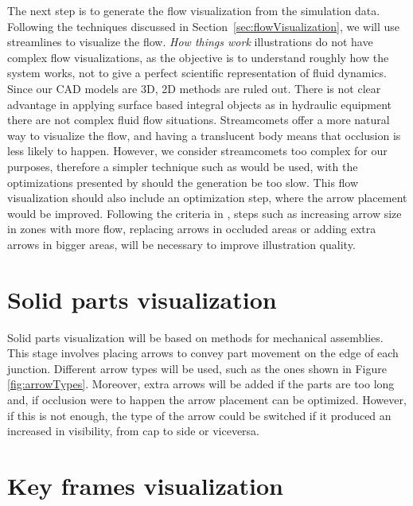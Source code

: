 The next step is to generate the flow visualization from the simulation data.
Following the techniques discussed in Section~\ref{sec:flowVisualization}, we will use streamlines to visualize the flow.
\textit{How things work} illustrations do not have complex flow visualizations, as the objective is to understand roughly how the system works, not to give a perfect scientific representation of fluid dynamics.
Since our CAD models are 3D, 2D methods are ruled out.
There is not clear advantage in applying surface based integral objects as in hydraulic equipment there are not complex fluid flow situations.
Streamcomets offer a more natural way to visualize the flow, and having a translucent body means that occlusion is less likely to happen.
However, we consider streamcomets too complex for our purposes, therefore a simpler technique such as \cite{Wicke2009} would be used, with the optimizations presented by \cite{McLoughlin2013} should the generation be too slow.
This flow visualization should also include an optimization step, where the arrow placement would be improved.
Following the criteria in \cite{Mitra2010}, steps such as increasing arrow size in zones with more flow, replacing arrows in occluded areas or adding extra arrows in bigger areas, will be necessary to improve illustration quality.

\section{Solid parts visualization}

Solid parts visualization will be based on \cite{Mitra2010} methods for mechanical assemblies.
This stage involves placing arrows to convey part movement on the edge of each junction.
Different arrow types will be used, such as the ones shown in Figure \ref{fig:arrowTypes}.
Moreover, extra arrows will be added if the parts are too long and, if occlusion were to happen the arrow placement can be optimized.
However, if this is not enough, the type of the arrow could be switched if it produced an increased in visibility, from cap to side or viceversa.

\section{Key frames visualization}

